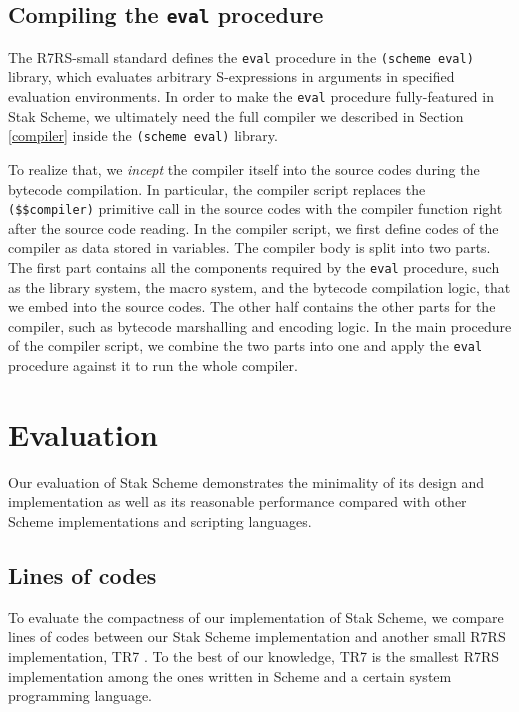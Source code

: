 \documentclass[sigplan, anonymous, review]{acmart}
\begin{document}
\subsection{Compiling the \texttt{eval} procedure} \label{inception}

The R7RS-small standard defines the \texttt{eval} procedure in the
\texttt{(scheme eval)} library, which evaluates arbitrary S-expressions in
arguments in specified evaluation environments.
In order to make the \texttt{eval} procedure fully-featured in Stak Scheme, we
ultimately need the full compiler we described in Section
\ref{compiler} inside the \texttt{(scheme eval)} library.

To realize that, we \textit{incept} the compiler itself into the
source codes during the bytecode compilation.
In particular, the compiler script replaces
the \texttt{(\$\$compiler)} primitive call in the source codes
with the compiler function right after the source code reading.
In the compiler script, we first define codes of the compiler as
data stored in variables.
The compiler body is split into two parts.
The first part contains all the components required by the \texttt{eval}
procedure, such as the library system, the macro system, and the
bytecode compilation logic, that we embed into the source codes.
The other half contains the other parts for the compiler, such
as bytecode marshalling and encoding logic.
In the main procedure of the compiler script, we combine the two
parts into one and apply the \texttt{eval} procedure against it to
run the whole compiler.

\section{Evaluation} \label{evaluation}

Our evaluation of Stak Scheme demonstrates the minimality of its design and
implementation as well as its reasonable performance compared with
other Scheme implementations and scripting languages.

\subsection{Lines of codes}

To evaluate the compactness of our implementation of Stak Scheme,
we compare lines of codes between our Stak Scheme implementation and
another small R7RS implementation, TR7 \cite{tr7}.
To the best of our knowledge, TR7 is the smallest R7RS implementation
among the ones written in Scheme and a certain system programming language.
\end{document}
